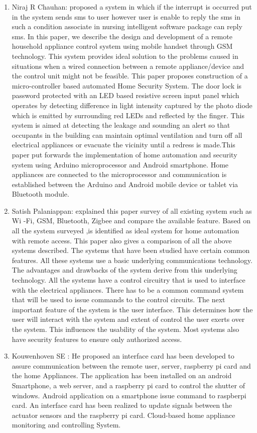 \begin{enumerate}
	\item Niraj R Chauhan: proposed a system in which if the interrupt is occurred put in the system sends sms to user however user is enable to reply the sms in such a condition associate in nursing intelligent software package can reply sms. In this paper, we describe the design and development of a remote household appliance control system using mobile handset through GSM technology. This system provides ideal solution to the problems caused in situations when a wired connection between a remote appliance/device and the control unit might not be feasible. This paper proposes construction of a micro-controller based automated Home Security System. The door lock is password protected with an LED based resistive screen input panel which operates by detecting difference in light intensity captured by the photo diode which is emitted by surrounding red LEDs and reflected by the finger. This system is aimed at detecting the leakage and sounding an alert so that occupants in the building can maintain optimal ventilation and turn off all electrical appliances or evacuate the vicinity until a redress is made.This paper put forwards the implementation of home automation and security system using Arduino microprocessor and Android smartphone. Home appliances are connected to the microprocessor and communication is established between the Arduino and Android mobile device or tablet via Bluetooth module.
	\item Satish Palaniappan: explained this paper survey of all existing system such as Wi -Fi, GSM, Bluetooth, Zigbee and compare the available feature. Based on all the system surveyed ,is identified as ideal system for home automation with remote access. This paper also gives a comparison of all the above systems described. The systems that have been studied have certain common features. All these systems use a basic underlying communications technology. The advantages and drawbacks of the system derive from this underlying technology. All the systems have a control circuitry that is used to interface with the electrical appliances. There has to be a common command system that will be used to issue commands to the control circuits. The next important feature of the system is the user interface. This determines how the user will interact with the system and extent of control the user exerts over the system. This influences the usability of the system. Most systems also have security features to ensure only authorized access.
	\item  Kouwenhoven SE : He proposed an interface card has been developed to assure communication between the remote user, server, raspberry pi card and the home Appliances. The application has been installed on an android Smartphone, a web server, and a raspberry pi card to control the shutter of windows. Android application on a smartphone issue command to raspberpi card. An interface card has been realized to update signals between the actuator sensors and the raspberry pi card. Cloud-based home appliance monitoring and controlling System.

\end{enumerate}
